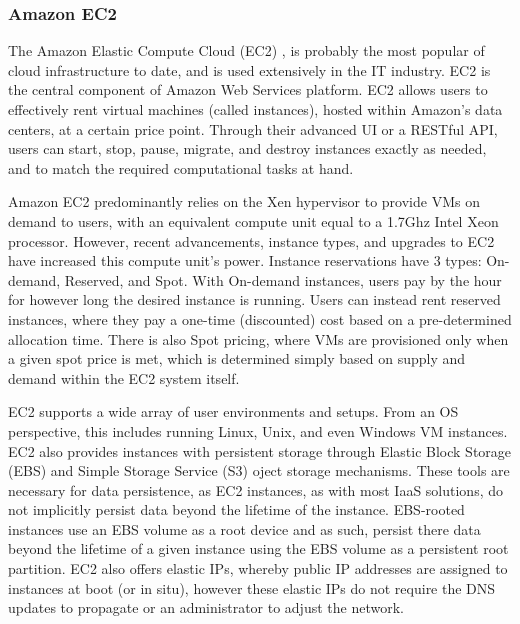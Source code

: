 
\subsubsection{Amazon EC2}


 The Amazon Elastic Compute Cloud (EC2) \cite{EC2}, is probably the most popular of cloud infrastructure to date, and is used extensively in the IT industry. EC2 is the central component of Amazon Web Services platform. EC2 allows users to effectively rent virtual machines (called instances), hosted within Amazon's data centers, at a certain price point. Through their advanced UI or a RESTful API, users can start, stop, pause, migrate, and destroy instances exactly as needed, and to match the required computational tasks at hand.   

Amazon EC2 predominantly relies on the Xen hypervisor to provide VMs on demand to users, with an equivalent compute unit equal to a 1.7Ghz Intel Xeon processor.  However, recent advancements, instance types, and upgrades to EC2 have increased this compute unit's power. Instance reservations have 3 types: On-demand, Reserved, and Spot. With On-demand instances, users pay by the hour for however long the desired instance is running. Users can instead rent reserved instances, where they pay a one-time (discounted) cost based on a pre-determined allocation time. There is also Spot pricing, where VMs are provisioned only when a given spot price is met, which is determined simply based on supply and demand within the EC2 system itself. 

EC2 supports a wide array of user environments and setups. From an OS perspective, this includes running Linux, Unix, and even Windows VM instances. EC2 also provides instances with persistent storage through Elastic Block Storage (EBS) and Simple Storage Service (S3) oject storage mechanisms. These tools are necessary for data persistence, as EC2 instances, as with most IaaS solutions, do not implicitly persist data beyond the lifetime of the instance. EBS-rooted instances use an EBS volume as a root device and as such, persist there data beyond the lifetime of a given instance using the EBS volume as a persistent root partition. EC2 also offers elastic IPs, whereby public IP addresses are assigned to instances at boot (or in situ), however these elastic IPs do not require the DNS updates to propagate or an administrator to adjust the network.  

